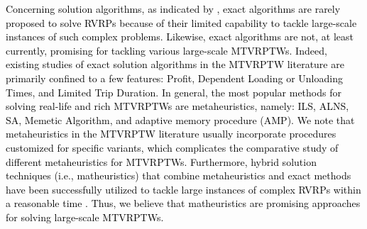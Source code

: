\documentclass[11pt]{article}
\newcommand\add[1]{\textcolor{black}{#1}}
\begin{document}


\add{Concerning solution algorithms, as indicated by \cite{lahyani2015rich}, exact algorithms are rarely proposed to solve RVRPs because of their limited capability to tackle large-scale instances of such complex problems.  Likewise, exact algorithms are not, at least currently, promising for tackling various large-scale MTVRPTWs.  Indeed, existing studies of exact solution algorithms in the MTVRPTW literature are primarily confined to a few features: Profit, Dependent Loading or Unloading Times, and Limited Trip Duration.  In general, the most popular methods for solving real-life and rich MTVRPTWs are metaheuristics, namely: ILS, ALNS, SA, Memetic Algorithm, and adaptive memory procedure (AMP).  We note that metaheuristics in the MTVRPTW literature usually incorporate procedures customized for specific variants, which complicates the comparative study of different metaheuristics for MTVRPTWs.  Furthermore, hybrid solution techniques (i.e., matheuristics) that combine metaheuristics and exact methods have been successfully utilized to tackle large instances of complex RVRPs within a reasonable time \citep{doerner2010survey, goel2020hybrid}.  Thus, we believe that matheuristics are promising approaches for solving large-scale MTVRPTWs.}
\newline

\end{document}
